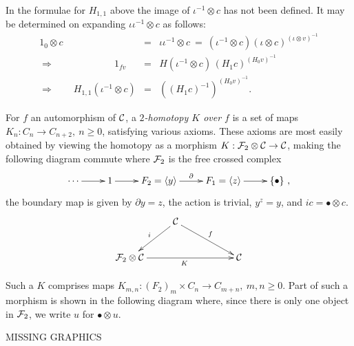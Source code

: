 \noindent
In the formulae for $H_{1,1}$ above the image of $\iota^{-1} \otimes c$ 
has not been defined.  
It may be determined on expanding $\iota\iota^{-1} \otimes c$ as follows: 
\begin{eqnarray*}
1_0 \otimes c 
  &=&  \iota\iota^{-1} \otimes c 
       ~=~ (\iota^{-1} \otimes c)(\iota \otimes c)^{(\iota \otimes v)^{-1}} \\
\Rightarrow \qquad\qquad\qquad~ 1_{fv} 
  &=&  H(\iota^{-1} \otimes c)\,(H_1c)^{(H_0v)^{-1}} \\
\Rightarrow \qquad H_{1,1}(\iota^{-1} \otimes c)
  &=&  ((H_1 c)^{-1})^{(H_0v)^{-1}} .
\end{eqnarray*}


\newpage
For $f$ an automorphism of $\mathcal{C}$, a \emph{$2$-homotopy $K$ over $f$} 
is a set of maps $K_n : C_n \to C_{n+2},~ n \geqslant 0$, 
satisfying various axioms. 
These axioms are most easily obtained by viewing the homotopy 
as a morphism $K : \mathcal{F}_2\otimes\mathcal{C} \to \mathcal{C}$, 
making the following diagram commute 
where $\mathcal{F}_2$ is the free crossed complex 
$$
\xymatrix{ 
  \cdots \ar[r] 
    & 1 \ar[r] 
      & F_2 = \langle y \rangle \ar[r]^{\partial}  
        & F_1 = \langle z \rangle \ar[r] 
          & \{\bullet\}~, 
}
$$
the boundary map is given by $\partial y = z$, 
the action is trivial, $y^z=y$, and $ic = \bullet \otimes c$. 
$$
\xymatrix{ 
   & \calC \ar[ld]_{i} \ar[drr]^f
     & & \\
  \calF_2\otimes\calC \ar[rrr]_{K}  
   & & & \calC 
}
$$

\medskip\noindent
Such a $K$ comprises maps 
$K_{m,n} : (F_2)_m \times C_n \to C_{m+n},~ m,n \geqslant 0$.  
Part of such a morphism is shown in the following diagram where, 
since there is only one object in $\mathcal{F}_2$, 
we write $u$ for $\bullet \otimes u$. 

\hspace*{6mm}
\begin{center}
MISSING GRAPHICS
\end{center}

